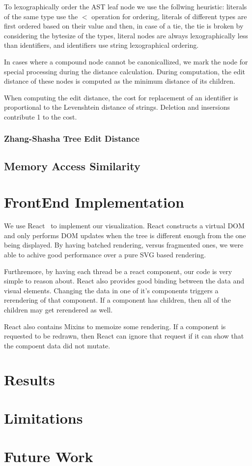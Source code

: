 \documentclass[nocopyrightspace]{sigchi}
\begin{document}
To lexographically order the AST leaf node we use the follwing heuristic:
literals of the same type use the $<$ operation for ordering,
literals of different types are first ordered based on their value and then,
in case of a tie, the tie is broken by considering the bytesize of the types,
literal nodes are always lexographically less than identifiers,
and identifiers use string lexographical ordering.

In cases where a compound node cannot be canonicallized, we mark the node for
special processing during the distance calculation. During computation, the edit
distance of these nodes is computed as the minimum distance of its children.

When computing the edit distance, the cost for replacement of an identifier is
proportional to the Levenshtein distance of strings. Deletion and insersions
contribute 1 to the cost.

\subsubsection{Zhang-Shasha Tree Edit Distance}



\subsection{Memory Access Similarity}



\section{FrontEnd Implementation}

We use React~\cite{reynders2014multi} to implement our visualization.
React constructs a virtual DOM and only performs DOM updates when
the tree is different enough from the one being displayed. 
By having batched rendering, versus fragmented ones, we 
were able to achive good performance over a pure SVG based 
rendering.

Furthremore, by having each thread be a react component, our code
is very simple to reason about. React also provides good binding 
between the data and visual elements. Changing the data in 
one of it's components triggers a rerendering of that component.
If a component has children, then all of the children may get
rerendered as well.

React also contains Mixins to memoize some rendering. If a 
component is requested to be redrawn, then React can ignore 
that request if it can show that the compoent data did not 
mutate.


\section{Results}



\section{Limitations}

\section{Future Work}



\end{document}
